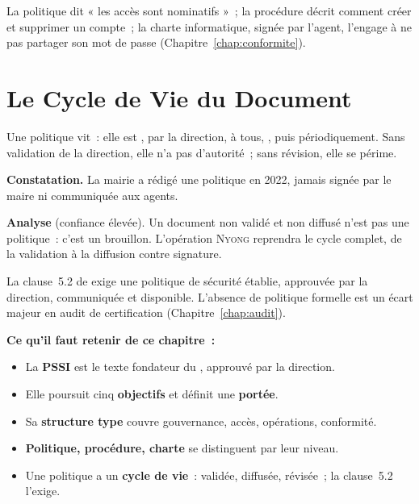 La politique dit « les accès sont nominatifs »~; la procédure décrit comment
créer et supprimer un compte~; la charte informatique, signée par l'agent,
l'engage à ne pas partager son mot de passe (Chapitre~\ref{chap:conformite}).

\section{Le Cycle de Vie du Document}
\label{sec:c05-cycle}

Une politique vit~: elle est ,  par la
direction,  à tous, , puis
 périodiquement. Sans validation de la direction, elle n'a
pas d'autorité~; sans révision, elle se périme.

\begin{boxprocedure}
\textbf{Constatation.} La mairie a rédigé une politique en 2022, jamais signée
par le maire ni communiquée aux agents.

\medskip
\textbf{Analyse} (confiance élevée). Un document non validé et non diffusé
n'est pas une politique~: c'est un brouillon. L'opération \textsc{Nyong}
reprendra le cycle complet, de la validation à la diffusion contre signature.
\end{boxprocedure}

\begin{boxjuris}
La clause~5.2 de  exige une politique de sécurité
établie, approuvée par la direction, communiquée et disponible. L'absence de
politique formelle est un écart majeur en audit de certification
(Chapitre~\ref{chap:audit}).
\end{boxjuris}

\separateur

\begin{boxresume}
\textbf{Ce qu'il faut retenir de ce chapitre~:}
\begin{itemize}
    \item La \textbf{PSSI} est le texte fondateur du , approuvé par
          la direction.
    \item Elle poursuit cinq \textbf{objectifs} et définit une \textbf{portée}.
    \item Sa \textbf{structure type} couvre gouvernance, accès, opérations,
          conformité.
    \item \textbf{Politique, procédure, charte} se distinguent par leur niveau.
    \item Une politique a un \textbf{cycle de vie}~: validée, diffusée,
          révisée~; la clause~5.2 l'exige.
\end{itemize}
\end{boxresume}


